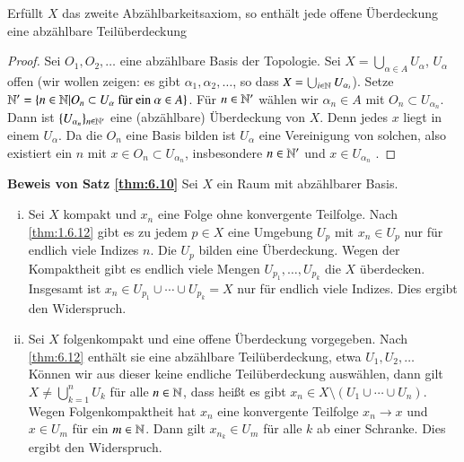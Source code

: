 \documentclass[a4paper,10pt]{scrartcl}
\begin{document}
\begin{lem}\label{thm:6.12}
 Erfüllt $X$ das zweite Abzählbarkeitsaxiom,  so enthält jede offene Überdeckung eine abzählbare Teilüberdeckung
\end{lem}
\begin{proof}
 Sei $O_1,O_2,\dotsc$ eine abzählbare Basis der Topologie. Sei $X=\bigcup_{\alpha\in A} U_\alpha$, $U_\alpha$ 
offen (wir wollen zeigen:  es gibt $\alpha_1, \alpha_2,\dotsc$, so dass $X=\bigcup_{i \in \mathbb{N}} U_{\alpha_i}$). 
Setze $\mathbb{N}'=\{n\in \mathbb{N}|O_n \subset U_\alpha \text{ für ein } \alpha \in A\}$.
Für $n\in \mathbb{N}'$ wählen wir $\alpha_n\in A$ mit $O_n\subset U_{\alpha_n}$. Dann ist $\{U_{\alpha_n}\}_{n\in \mathbb{N}'}$ eine (abzählbare) Überdeckung von $X$. 
Denn jedes $x$ liegt in einem $U_\alpha$. Da die $O_n$ eine Basis bilden ist $U_\alpha$ eine Vereinigung von solchen, also existiert ein $n$ mit $x\in O_n\subset U_{\alpha_n}$, insbesondere $n\in \mathbb{N}'$ und $x\in U_{\alpha_n}$ .
\end{proof}
\begin{seg}{\textbf{Beweis von Satz \ref{thm:6.10}}}
 Sei $X$ ein Raum mit abzählbarer Basis.
\begin{enumerate}[(i)]
 \item Sei $X$ kompakt und $x_n$ eine Folge ohne konvergente Teilfolge. Nach \ref{thm:1.6.12} gibt es zu jedem $p\in X$ eine Umgebung $U_p$ mit $x_n\in U_p$ nur für endlich viele Indizes $n$. Die $U_p$ bilden eine Überdeckung. Wegen der Kompaktheit gibt es endlich viele Mengen $U_{p_1}, \dotsc, U_{p_k}$ die $X$ überdecken. Insgesamt ist $x_n\in U_{p_1}\cup \dotsb \cup U_{p_k}=X$ nur für endlich viele Indizes. Dies ergibt den Widerspruch.
 \item Sei $X$ folgenkompakt und eine offene Überdeckung vorgegeben. Nach \ref{thm:6.12} enthält sie eine abzählbare Teilüberdeckung, etwa $U_1, U_2, \dotsc  $ Können wir aus dieser keine endliche Teilüberdeckung auswählen, dann gilt $X\neq \bigcup_{k=1}^nU_k$ für alle $n \in \mathbb{N}$, dass heißt es gibt $x_n\in X\setminus(U_1\cup\dotsb \cup U_n)$. Wegen Folgenkompaktheit hat $x_n$ eine konvergente Teilfolge $x_n \to x$ und $x\in U_m$ für ein $m\in \mathbb{N}$. Dann gilt $x_{n_k}\in U_m$ für alle $k$ ab einer Schranke. Dies ergibt den Widerspruch.
\end{enumerate}
\end{seg}
\end{document}

